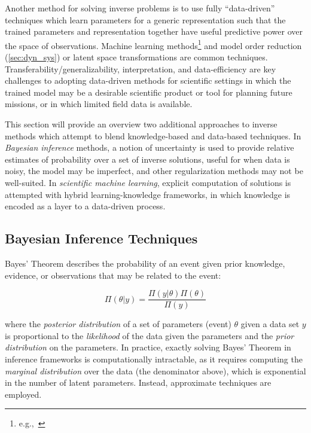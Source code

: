 Another method for solving inverse problems is to use fully ``data-driven'' techniques which learn parameters for a generic representation such that the trained parameters and representation together have useful predictive power over the space of observations. Machine learning methods\footnote{e.g.,~\cite{lu2020extracting,follmann2019predicting,blanchard2019learning,chen2019presentation,pathak2018model}} and model order reduction (\cref{sec:dyn_sys}) or latent space transformations\autocite{bigoni2019greedy,spantini2018inference} are common techniques. Transferability/generalizability, interpretation, and data-efficiency are key challenges to adopting data-driven methods for scientific settings in which the trained model may be a desirable scientific product or tool for planning future missions, or in which limited field data is available.

This section will provide an overview two additional approaches to inverse methods which attempt to blend knowledge-based and data-based techniques. In \emph{Bayesian inference} methods, a notion of uncertainty is used to provide relative estimates of probability over a set of inverse solutions, useful for when data is noisy, the model may be imperfect, and other regularization methods may not be well-suited\autocite{stuart2010inverse}. In \emph{scientific machine learning}, explicit computation of solutions is attempted with hybrid learning-knowledge frameworks, in which knowledge is encoded as a layer to a data-driven process\autocite{baker2019workshop}.

\subsection{Bayesian Inference Techniques}
Bayes' Theorem\autocite{bayes1763lii} describes the probability of an event given prior knowledge, evidence, or observations that may be related to the event:

\begin{equation}
    \Pi(\theta | y) = \frac{\Pi(y | \theta)\Pi(\theta)}{\Pi(y)}
\end{equation}

\noindent where the \emph{posterior distribution} of a set of parameters (event) $\theta$ given a data set $y$ is proportional to the \emph{likelihood} of the data given the parameters and the \emph{prior distribution} on the parameters. In practice, exactly solving Bayes' Theorem in inference frameworks is computationally intractable, as it requires computing the \emph{marginal distribution} over the data (the denominator above), which is exponential in the number of latent parameters. Instead, approximate techniques are employed.

